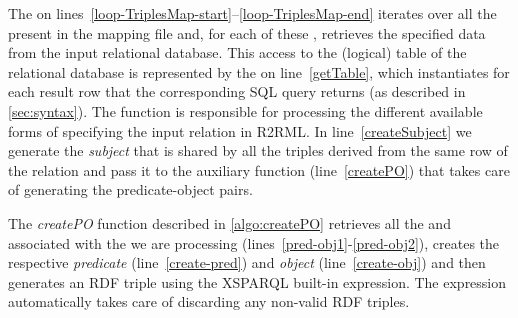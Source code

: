 The \SparqlForClause on lines~\ref{loop-TriplesMap-start}--\ref{loop-TriplesMap-end} iterates over all the
 present in the mapping file and, for each of these , retrieves the specified data
from the input relational database.
%
This access to the (logical) table of the relational database is represented by the \SQLForClause on
line~\ref{getTable}, which instantiates  for each result row that the corresponding \ac{SQL} query returns (as
described in \cref{sec:syntax}).  The function  is responsible for processing the different
available forms of specifying the input relation in R2RML.
%
In line~\ref{createSubject} we generate the \emph{subject} that is shared by all the triples derived from the same row
of the relation and pass it to the  auxiliary function (line~\ref{createPO}) that takes care of generating
the predicate-object pairs.


\begin{algorithm}[t]
  \caption{ }
  \label{algo:createPO}
  \DontPrintSemicolon
  \SPARQLForClause *  \; 
   
\end{algorithm}
%
The \textit{createPO} function described in \cref{algo:createPO} retrieves all the  and
 associated with the  we are processing (lines~\ref{pred-obj1}-\ref{pred-obj2}), creates
the respective \emph{predicate} (line~\ref{create-pred}) and \emph{object} (line~\ref{create-obj}) and then generates an
\ac{RDF} triple using the XSPARQL built-in \CONSTRUCT expression.  The \CONSTRUCT expression automatically takes care of
discarding any non-valid \ac{RDF} triples.



